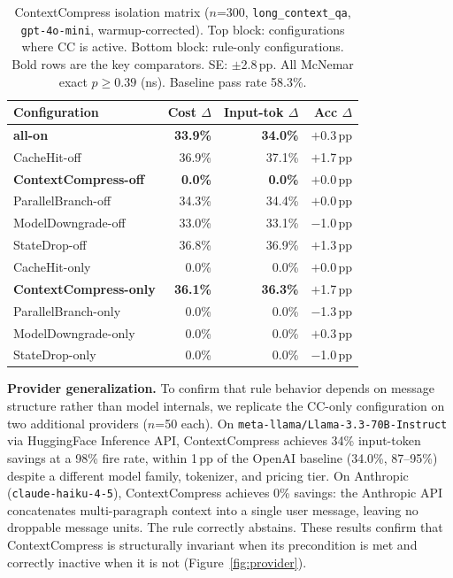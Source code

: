 \documentclass[sigconf,9pt]{acmart}
\begin{document}
\begin{table}[t]
\caption{ContextCompress isolation matrix ($n$=300, \texttt{long\_context\_qa},
\texttt{gpt-4o-mini}, warmup-corrected). Top block: configurations where CC is
active. Bottom block: rule-only configurations. Bold rows are the key comparators.
SE: $\pm$2.8\,pp. All McNemar exact $p \geq 0.39$ (ns). Baseline pass rate 58.3\%.}
\label{tab:cc-matrix}
\small
\begin{tabular}{lrrr}
\toprule
Configuration & Cost $\Delta$ & Input-tok $\Delta$ & Acc $\Delta$ \\
\midrule
\textbf{all-on}                 & \textbf{33.9\%} & \textbf{34.0\%} & $+$0.3\,pp \\
CacheHit-off                    & 36.9\% & 37.1\% & $+$1.7\,pp \\
\textbf{ContextCompress-off}    & \textbf{0.0\%}  & \textbf{0.0\%}  & $+$0.0\,pp \\
ParallelBranch-off              & 34.3\% & 34.4\% & $+$0.0\,pp \\
ModelDowngrade-off              & 33.0\% & 33.1\% & $-$1.0\,pp \\
StateDrop-off                   & 36.8\% & 36.9\% & $+$1.3\,pp \\
\midrule
CacheHit-only                   & 0.0\%  & 0.0\%  & $+$0.0\,pp \\
\textbf{ContextCompress-only}   & \textbf{36.1\%} & \textbf{36.3\%} & $+$1.7\,pp \\
ParallelBranch-only             & 0.0\%  & 0.0\%  & $-$1.3\,pp \\
ModelDowngrade-only             & 0.0\%  & 0.0\%  & $+$0.3\,pp \\
StateDrop-only                  & 0.0\%  & 0.0\%  & $-$1.0\,pp \\
\bottomrule
\end{tabular}
\end{table}

\textbf{Provider generalization.} To confirm that rule behavior depends on message
structure rather than model internals, we replicate the CC-only configuration on two
additional providers ($n$=50 each). On
\texttt{meta\allowbreak-llama/Llama-3.3-70B-Instruct} via HuggingFace Inference API,
ContextCompress achieves 34\% input-token savings at a 98\% fire rate, within
1\,pp of the OpenAI baseline (34.0\%, 87--95\%) despite a different model family,
tokenizer, and pricing tier. On Anthropic (\texttt{claude-haiku-4-5}),
ContextCompress achieves 0\% savings: the Anthropic API concatenates multi-paragraph
context into a single user message, leaving no droppable message units. The rule
correctly abstains. These results confirm that ContextCompress is structurally
invariant when its precondition is met and correctly inactive when it is not
(Figure~\ref{fig:provider}).
\end{document}
